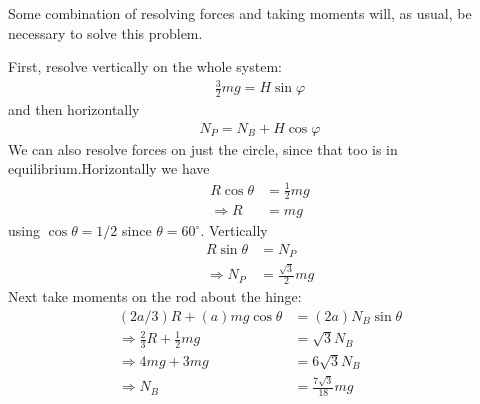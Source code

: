 \begin{problem}[A1989FMIIQ1a]
{Some combination of resolving forces and taking moments will, as usual, be necessary to solve this problem.

 First, resolve vertically on the whole system:
\begin{align*}
\frac{3}{2}mg=H\sin\varphi
\end{align*}
and then horizontally
\begin{align*}
N_P=N_B+H\cos\varphi
\end{align*}
We can also resolve forces on just the circle, since that too is in equilibrium.Horizontally we have
\begin{align*}
R\cos\theta&=\frac{1}{2}mg \\
\Rightarrow R&=mg
\end{align*}
using $\cos\theta=1/2$ since $\theta=60^\circ$. Vertically
\begin{align*}
R\sin\theta&=N_P \\
\Rightarrow N_P&=\frac{\sqrt 3}{2}mg
\end{align*}
Next take moments on the rod about the hinge:
\begin{align*}
(2a/3)R+(a)mg\cos\theta&=(2a)N_B\sin\theta \\
\Rightarrow \frac{2}{3}R+\frac{1}{2}mg&=\sqrt 3N_B \\
\Rightarrow 4mg+3mg&=6\sqrt 3N_B \\
\Rightarrow N_B&=\frac{7\sqrt 3}{18}mg
\end{align*}
}
\end{problem}